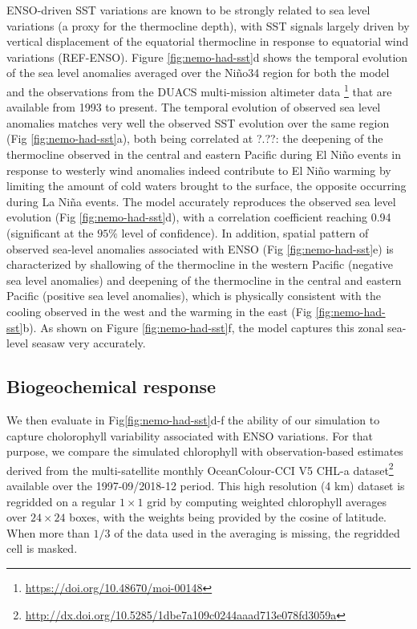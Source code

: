 ENSO-driven SST variations are known to be strongly related to sea level variations (a proxy for the thermocline depth), with SST signals largely driven by vertical displacement of the equatorial thermocline in response to equatorial wind variations (REF-ENSO). Figure \ref{fig:nemo-had-sst}d shows the temporal evolution of the sea level anomalies averaged over the Niño34 region for both the model and the observations from the DUACS multi-mission altimeter data \footnote{\url{https://doi.org/10.48670/moi-00148}} that are available from 1993 to present. The temporal evolution of observed sea level anomalies matches very well the observed SST evolution over the same region (Fig \ref{fig:nemo-had-sst}a), both being correlated at ?.??: the deepening of the thermocline observed in the central and eastern Pacific during El Niño events in response to westerly wind anomalies indeed contribute to El Niño warming by limiting the amount of cold waters brought to the surface, the opposite occurring during La Niña events.  The model accurately reproduces the observed sea level evolution (Fig \ref{fig:nemo-had-sst}d), with a correlation coefficient reaching 0.94 (significant at the $95\%$ level of confidence). In addition,  spatial pattern of observed sea-level anomalies associated with ENSO (Fig \ref{fig:nemo-had-sst}e) is characterized by shallowing of the thermocline  in the western Pacific (negative sea level anomalies) and deepening of the thermocline  in the central and eastern Pacific (positive sea level anomalies), which is physically consistent with the cooling observed in the west and the warming in the east (Fig \ref{fig:nemo-had-sst}b). As shown on Figure \ref{fig:nemo-had-sst}f, the model captures this zonal sea-level seasaw very accurately.

\subsection{Biogeochemical response}

We then evaluate in Fig\ref{fig:nemo-had-sst}d-f the ability of our simulation to capture cholorophyll variability associated with ENSO variations. For that purpose, we compare the simulated chlorophyll with observation-based estimates derived from the multi-satellite monthly OceanColour-CCI V5 CHL-a dataset\footnote{\url{http://dx.doi.org/10.5285/1dbe7a109c0244aaad713e078fd3059a}} \citep{sathyendranathOceanColourTimeSeries2019} available over the 1997-09/2018-12 period. This high resolution (4 km)  dataset is regridded on a regular $1\times 1$ grid by computing weighted chlorophyll averages over $24\times24$ boxes, with the weights being provided by the cosine of latitude. When more than $1/3$ of the data used in the averaging is missing, the regridded cell is masked.


